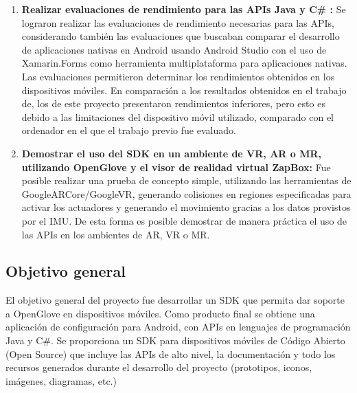 \begin{enumerate}

\item \textbf{Realizar evaluaciones de rendimiento para las APIs Java y C\# :} 
Se lograron realizar las evaluaciones de rendimiento necesarias para las APIs, considerando también las evaluaciones que buscaban comparar el desarrollo de aplicaciones nativas en Android usando Android Studio con el uso de Xamarin.Forms como herramienta multiplataforma para aplicaciones nativas. Las evaluaciones permitieron determinar los rendimientos obtenidos en los dispositivos móviles. En comparación a los resultados obtenidos en el trabajo de\cite{tesis-cerda-rodrigo}, los de este proyecto presentaron rendimientos inferiores, pero esto es debido a las limitaciones del dispositivo móvil utilizado, comparado con el ordenador en el que el trabajo previo fue evaluado.

\item \textbf{Demostrar el uso del SDK en un ambiente de VR, AR o MR, utilizando OpenGlove y el visor de realidad virtual ZapBox:}
Fue posible realizar una prueba de concepto simple, utilizando las herramientas de GoogleARCore/GoogleVR, generando colisiones en regiones especificadas para activar los actuadores y generando el movimiento gracias a los datos provistos por el IMU. De esta forma es posible demostrar de manera práctica el uso de las APIs en los ambientes de AR, VR o MR.

\end{enumerate}

\subsection{Objetivo general}
El objetivo general del proyecto fue desarrollar un SDK que permita dar soporte a OpenGlove en dispositivos móviles. Como producto final se obtiene una aplicación de configuración para Android, con APIs en lenguajes de programación Java y C\#. Se proporciona un SDK para dispositivos móviles de Código Abierto (Open Source) que incluye las APIs de alto nivel, la documentación y todo los recursos generados durante el desarrollo del proyecto (prototipos, iconos, imágenes, diagramas, etc.)